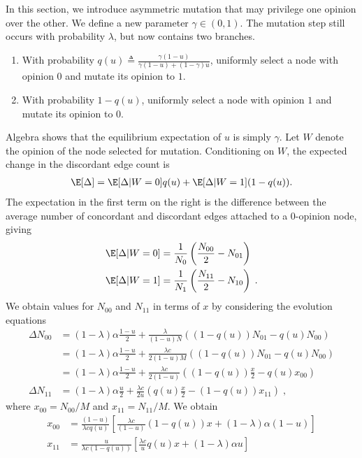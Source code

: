 \documentclass[english]{scrartcl}
\begin{document}
		In this section, we introduce asymmetric mutation that may privilege one opinion over the other. 
		We define a new parameter $\gamma \in (0,1)$.
		The mutation step still occurs with probability $\lambda$, but now contains two branches. 
		\begin{enumerate}
			\item With probability $q(u) \triangleq \frac{\gamma(1-u)}{\gamma(1-u)+(1-\gamma)u}$, uniformly select a node with opinion $0$ and mutate its opinion to $1$. 
			\item With probability $1-q(u)$, uniformly select a node with opinion $1$ and mutate its opinion to $0$. 
		\end{enumerate}
		Algebra shows that the equilibrium expectation of $u$ is simply $\gamma$. 
		Let $W$ denote the opinion of the node selected for mutation. Conditioning on $W$, the expected change in the discordant edge count is 
		\begin{align*}
			\E[\Delta] = \E[\Delta|W = 0]q(u) + \E[\Delta |W = 1](1-q(u)).
		\end{align*}
		The expectation in the first term on the right is the difference between the average number of concordant and discordant edges attached to a $0$-opinion node, giving 
		\begin{align*}
			\E[\Delta|W = 0] &= \frac{1}{N_0}\left(\frac{N_{00}}{2} - N_{01}\right) \\ 
			\E[\Delta|W = 1] &= \frac{1}{N_1}\left(\frac{N_{11}}{2} - N_{10}\right)\;.
		\end{align*}
		We obtain values for $N_{00}$ and $N_{11}$ in terms of $x$ by considering the evolution equations
		\begin{align*}
		 	\Delta N_{00} &= (1-\lambda) \alpha \frac{1-u}{2} + \frac{\lambda}{(1-u)N}\left((1-q(u))N_{01} - q(u)N_{00}\right) \\ 
		 	&= (1-\lambda) \alpha \frac{1-u}{2} + \frac{\lambda c}{2(1-u)M}\left((1-q(u))N_{01} - q(u)N_{00}\right) \\ 
		 	&= (1-\lambda) \alpha \frac{1-u}{2} + \frac{\lambda c}{2(1-u)}\left((1-q(u))\frac{x}{2} - q(u)x_{00}\right) \\ 
		 	\Delta N_{11} &= (1-\lambda) \alpha \frac{u}{2}   + \frac{\lambda c}{2u}\left(q(u) \frac{x}{2} - (1-q(u)) x_{11}\right)\;,
		\end{align*} 
		where $x_{00} = N_{00} / M$ and $x_{11} = N_{11}/M$. We obtain 
		\begin{align}
			x_{00} &= \frac{(1-u)}{\lambda c q(u)}\left[\frac{\lambda c}{(1-u)}(1-q(u))x+ (1-\lambda)\alpha (1-u)\right] \\ 
			x_{11} &= \frac{u}{\lambda c(1-q(u))}\left[\frac{\lambda c}{ u}q(u)x+(1-\lambda)\alpha u\right]
		\end{align}
		
\end{document}
